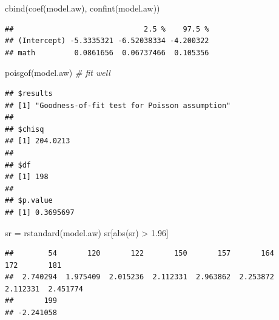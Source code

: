 \documentclass[
]{book}
\makeatletter
\newenvironment{Shaded}{\begin{snugshade}}{\end{snugshade}}
\newcommand{\AttributeTok}[1]{\textcolor[rgb]{0.61,0.61,0.61}{#1}}
\newcommand{\CommentTok}[1]{\textcolor[rgb]{0.37,0.37,0.37}{\textit{#1}}}
\newcommand{\DecValTok}[1]{\textcolor[rgb]{0.06,0.06,0.06}{#1}}
\newcommand{\FloatTok}[1]{\textcolor[rgb]{0.06,0.06,0.06}{#1}}
\newcommand{\FunctionTok}[1]{\textcolor[rgb]{0,0,0}{#1}}
\newcommand{\NormalTok}[1]{#1}
\newcommand{\OtherTok}[1]{\textcolor[rgb]{0.37,0.37,0.37}{#1}}
\newcommand{\SpecialCharTok}[1]{\textcolor[rgb]{0,0,0}{#1}}
\newenvironment{kframe}{%
\medskip{}
\setlength{\fboxsep}{.8em}
 \def\at@end@of@kframe{}%
 \ifinner\ifhmode%
  \def\at@end@of@kframe{\end{minipage}}%
  \begin{minipage}{\columnwidth}%
 \fi\fi%
 \def\FrameCommand##1{\hskip\@totalleftmargin \hskip-\fboxsep
 \colorbox{shadecolor}{##1}\hskip-\fboxsep
     \hskip-\linewidth \hskip-\@totalleftmargin \hskip\columnwidth}%
 \MakeFramed {\advance\hsize-\width
   \@totalleftmargin\z@ \linewidth\hsize
   \@setminipage}}%
 {\par\unskip\endMakeFramed%
 \at@end@of@kframe}
\renewenvironment{Shaded}{\begin{kframe}}{\end{kframe}}
\makeatother
\begin{document}
\begin{Shaded}
\begin{Highlighting}[]
\FunctionTok{cbind}\NormalTok{(}\FunctionTok{coef}\NormalTok{(model.aw), }\FunctionTok{confint}\NormalTok{(model.aw))}
\end{Highlighting}
\end{Shaded}

\begin{verbatim}
##                              2.5 %    97.5 %
## (Intercept) -5.3335321 -6.52038334 -4.200322
## math         0.0861656  0.06737466  0.105356
\end{verbatim}

\begin{Shaded}
\begin{Highlighting}[]
\FunctionTok{poisgof}\NormalTok{(model.aw)  }\CommentTok{\# fit well}
\end{Highlighting}
\end{Shaded}

\begin{verbatim}
## $results
## [1] "Goodness-of-fit test for Poisson assumption"
## 
## $chisq
## [1] 204.0213
## 
## $df
## [1] 198
## 
## $p.value
## [1] 0.3695697
\end{verbatim}

\begin{Shaded}
\begin{Highlighting}[]
\NormalTok{sr }\OtherTok{=} \FunctionTok{rstandard}\NormalTok{(model.aw)}
\NormalTok{sr[}\FunctionTok{abs}\NormalTok{(sr) }\SpecialCharTok{\textgreater{}} \FloatTok{1.96}\NormalTok{]}
\end{Highlighting}
\end{Shaded}

\begin{verbatim}
##        54       120       122       150       157       164       172       181 
##  2.740294  1.975409  2.015236  2.112331  2.963862  2.253872  2.112331  2.451774 
##       199 
## -2.241058
\end{verbatim}

\begin{Shaded}
\end{Shaded}
\end{document}
